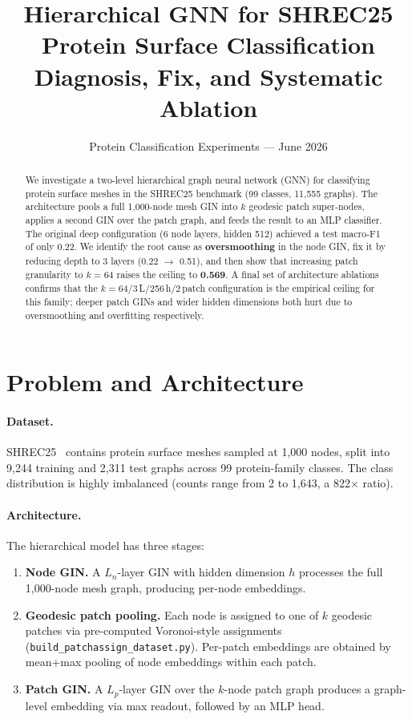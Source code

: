\documentclass[11pt,a4paper]{article}
\title{\textbf{Hierarchical GNN for SHREC25 Protein Surface Classification}\\
       \large Diagnosis, Fix, and Systematic Ablation}
\author{Protein Classification Experiments --- June 2026}
\date{}
\begin{document}
\maketitle
\thispagestyle{empty}

\begin{abstract}
We investigate a two-level hierarchical graph neural network (GNN) for classifying
protein surface meshes in the SHREC25 benchmark (99 classes, 11{,}555 graphs).
The architecture pools a full 1{,}000-node mesh GIN into $k$ geodesic patch
super-nodes, applies a second GIN over the patch graph, and feeds the result to an
MLP classifier.
The original deep configuration (6 node layers, hidden 512) achieved a test
macro-F1 of only 0.22.
We identify the root cause as \textbf{oversmoothing} in the node GIN, fix it by
reducing depth to 3 layers (0.22 $\to$ 0.51), and then show that increasing patch
granularity to $k{=}64$ raises the ceiling to \textbf{0.569}.
A final set of architecture ablations confirms that the $k{=}64$/3\,L/256\,h/2\,patch
configuration is the empirical ceiling for this family; deeper patch GINs and wider
hidden dimensions both hurt due to oversmoothing and overfitting respectively.
\end{abstract}

\section{Problem and Architecture}

\paragraph{Dataset.}
SHREC25~\cite{shrec25} contains protein surface meshes sampled at 1{,}000 nodes,
split into 9{,}244 training and 2{,}311 test graphs across 99 protein-family classes.
The class distribution is highly imbalanced (counts range from 2 to 1{,}643, a
822$\times$ ratio).

\paragraph{Architecture.}
The hierarchical model has three stages:
\begin{enumerate}
  \item \textbf{Node GIN.} A $L_n$-layer GIN with hidden dimension $h$ processes
        the full 1{,}000-node mesh graph, producing per-node embeddings.
  \item \textbf{Geodesic patch pooling.} Each node is assigned to one of $k$
        geodesic patches via pre-computed Voronoi-style assignments
        (\texttt{build\_patchassign\_dataset.py}).
        Per-patch embeddings are obtained by mean+max pooling of node embeddings
        within each patch.
  \item \textbf{Patch GIN.} A $L_p$-layer GIN over the $k$-node patch graph
        produces a graph-level embedding via max readout, followed by an MLP head.
\end{enumerate}
\end{document}
